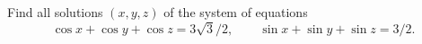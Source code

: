 Find all solutions $(x, y, z)$ of the system of equations
\[ \cos x + \cos y + \cos z = 3\sqrt{3}/2,\qquad \sin x + \sin y + \sin z = 3/2. \]
